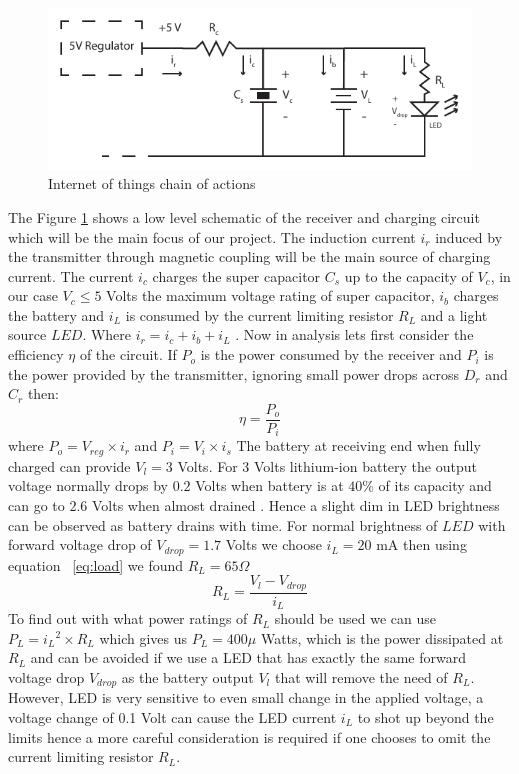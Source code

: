 


\begin{figure}[h!]
\centering
\includegraphics[width=1\textwidth]{rec_design.pdf}
\caption{Internet of things chain of actions}
\label{fig:rec_des}
\end{figure}


The Figure \ref{fig:rec_des} shows a low level schematic of the receiver and charging circuit which will be the main focus of our project. The induction current $i_r$ induced by the transmitter through magnetic coupling will be the main source of charging current. The current $i_c$ charges the super capacitor $C_s$ up to the capacity of $V_c$, in our case $V_c \leq 5$ Volts the maximum voltage rating of super capacitor, $i_b$ charges the battery and $i_L$ is consumed by the current limiting resistor $R_L$  and a light source $LED$. Where $i_r = i_c + i_b +i_L$ . Now in analysis lets first consider the efficiency ${\eta}$ of the circuit.
If $P_{o}$ is the power consumed by the receiver and $P_{i}$ is the power provided by the transmitter, ignoring small power drops across $D_r$ and $C_r$  then:
\begin{equation}\label{eq:effb}
 {\eta} = \frac{P_o}{P_i}
\end{equation}
where $P_o = V_{reg} \times i_r $ and $P_i = V_i \times i_s $
The battery at receiving end when fully charged can provide $V_l = 3 $ Volts.
For 3 Volts lithium-ion battery the output voltage normally drops by $0.2 $ Volts when battery is at $40 \%$ of its capacity and can go to $2.6 $ Volts when almost drained \cite{IAmp}. Hence a slight dim in LED brightness can be observed as battery drains with time.
For normal brightness of $LED$ with forward voltage drop of $V_{drop} = 1.7 $ Volts we choose $i_L = 20 $ mA then using equation ~\ref{eq:load} we found $R_L = 65 \Omega $
\begin{equation}\label{eq:load}
 R_L = \frac{V_l - V_{drop}}{i_L}
\end{equation}
To find out with what power ratings of $R_L$ should be used we can use $P_L = {i_L}^2 \times R_L $ which gives us $P_L = 400 \mu$ Watts, which is the power dissipated at $R_L$ and can be avoided if we use a LED that has exactly the same forward voltage drop $V_{drop}$ as the battery output $V_l$ that will remove the need of $R_L$. However, LED is very sensitive to even small change in the applied voltage, a voltage change of 0.1 Volt can cause the LED current $i_L$ to shot up beyond the limits hence a more careful consideration is required if one chooses to omit the current limiting resistor $R_L$.
